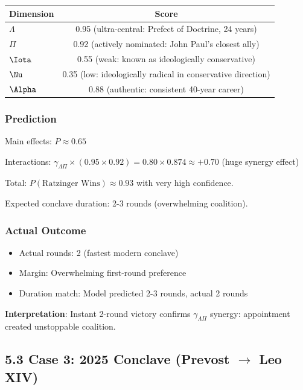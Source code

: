 \documentclass[11pt]{article}
\begin{document}
\begin{table}[h]
\centering
\begin{tabular}{|l|c|}
\hline
Dimension & Score \\
\hline
$\Lambda$ & 0.95 (ultra-central: Prefect of Doctrine, 24 years) \\
$\Pi$ & 0.92 (actively nominated: John Paul's closest ally) \\
$\Iota$ & 0.55 (weak: known as ideologically conservative) \\
$\Nu$ & 0.35 (low: ideologically radical in conservative direction) \\
$\Alpha$ & 0.88 (authentic: consistent 40-year career) \\
\hline
\end{tabular}
\end{table}

\subsubsection{Prediction}

Main effects: $P \approx 0.65$

Interactions: $\gamma_{\Lambda\Pi} \times (0.95 \times 0.92) = 0.80 \times 0.874 \approx +0.70$ (huge synergy effect)

Total: $P(\text{Ratzinger Wins}) \approx 0.93$ with very high confidence.

Expected conclave duration: 2-3 rounds (overwhelming coalition).

\subsubsection{Actual Outcome}

\begin{itemize}
\item Actual rounds: 2 (fastest modern conclave)
\item Margin: Overwhelming first-round preference
\item Duration match: Model predicted 2-3 rounds, actual 2 rounds
\end{itemize}

\textbf{Interpretation}: Instant 2-round victory confirms $\gamma_{\Lambda\Pi}$ synergy: appointment created unstoppable coalition.

\subsection{5.3 Case 3: 2025 Conclave (Prevost $\to$ Leo XIV)}
\end{document}
